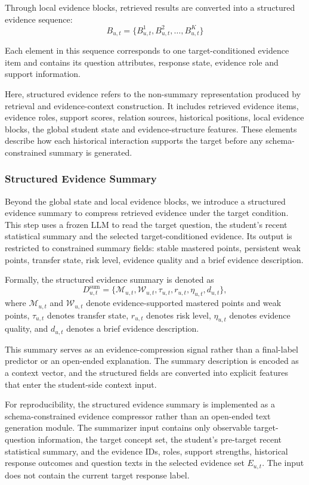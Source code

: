 \documentclass[a4paper,12pt]{article}
\numberwithin{table}{section}
\begin{document}
Through local evidence blocks, retrieved results are converted into a structured evidence sequence:
\[
B_{u,t}=\{B_{u,t}^{1},B_{u,t}^{2},\ldots,B_{u,t}^{K}\}
\]

Each element in this sequence corresponds to one target-conditioned evidence item and contains its question attributes, response state, evidence role and support information.

Here, structured evidence refers to the non-summary representation produced by retrieval and evidence-context construction. It includes retrieved evidence items, evidence roles, support scores, relation sources, historical positions, local evidence blocks, the global student state and evidence-structure features. These elements describe how each historical interaction supports the target before any schema-constrained summary is generated.

\subsubsection{Structured Evidence Summary}

Beyond the global state and local evidence blocks, we introduce a structured evidence summary to compress retrieved evidence under the target condition. This step uses a frozen LLM to read the target question, the student's recent statistical summary and the selected target-conditioned evidence. Its output is restricted to constrained summary fields: stable mastered points, persistent weak points, transfer state, risk level, evidence quality and a brief evidence description.

Formally, the structured evidence summary is denoted as
\[
D^{\mathrm{sum}}_{u,t}=\{\mathcal M_{u,t},\mathcal W_{u,t},\tau_{u,t},r_{u,t},\eta_{u,t},d_{u,t}\},
\]
where \(\mathcal M_{u,t}\) and \(\mathcal W_{u,t}\) denote evidence-supported mastered points and weak points, \(\tau_{u,t}\) denotes transfer state, \(r_{u,t}\) denotes risk level, \(\eta_{u,t}\) denotes evidence quality, and \(d_{u,t}\) denotes a brief evidence description.

This summary serves as an evidence-compression signal rather than a final-label predictor or an open-ended explanation. The summary description is encoded as a context vector, and the structured fields are converted into explicit features that enter the student-side context input.

For reproducibility, the structured evidence summary is implemented as a schema-constrained evidence compressor rather than an open-ended text generation module. The summarizer input contains only observable target-question information, the target concept set, the student's pre-target recent statistical summary, and the evidence IDs, roles, support strengths, historical response outcomes and question texts in the selected evidence set \(E_{u,t}\). The input does not contain the current target response label.
\end{document}
